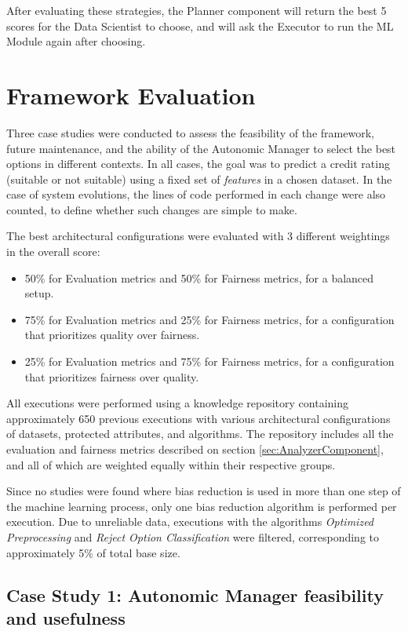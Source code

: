 \documentclass[sigconf]{acmart}
\begin{document}
After evaluating these strategies, the Planner component will return the best 5 scores for the Data Scientist to choose, and will ask the Executor to run the ML Module again after choosing.

\section{Framework Evaluation}

Three case studies were conducted to assess the feasibility of the framework, future maintenance, and the ability of the Autonomic Manager to select the best options in different contexts. In all cases, the goal was to predict a credit rating (suitable or not suitable) using a fixed set of \textit{features} in a chosen dataset. In the case of system evolutions, the lines of code performed in each change were also counted, to define whether such changes are simple to make.

The best architectural configurations were evaluated with 3 different weightings in the overall score:

\begin{itemize}
\item 50\% for Evaluation metrics and 50\% for Fairness metrics, for a balanced setup.
\item 75\% for Evaluation metrics and 25\% for Fairness metrics, for a configuration that prioritizes quality over fairness.
\item 25\% for Evaluation metrics and 75\% for Fairness metrics, for a configuration that prioritizes fairness over quality.
\end{itemize}

All executions were performed using a knowledge repository containing approximately 650 previous executions with various architectural configurations of datasets, protected attributes, and algorithms. The repository includes all the evaluation and fairness metrics described on section \ref{sec:AnalyzerComponent}, and all of which are weighted equally within their respective groups.

Since no studies were found where bias reduction is used in more than one step of the machine learning process, only one bias reduction algorithm is performed per execution. Due to unreliable data, executions with the algorithms \textit{Optimized Preprocessing} and \textit{Reject Option Classification} were filtered, corresponding to approximately 5\% of total base size.

\subsection{Case Study 1: Autonomic Manager feasibility and usefulness}
\end{document}
